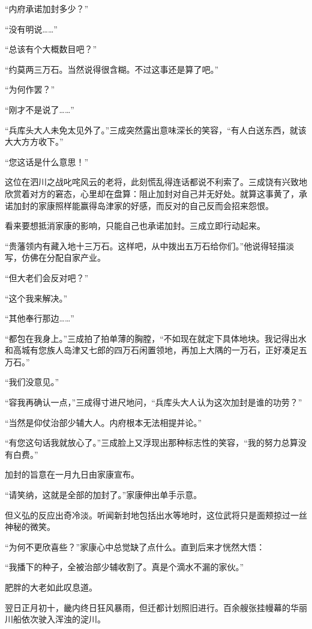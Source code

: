 \documentclass[
]{book}
\begin{document}
``内府承诺加封多少？''

``没有明说\ldots\ldots{}''

``总该有个大概数目吧？''

``约莫两三万石。当然说得很含糊。不过这事还是算了吧。''

``为何作罢？''

``刚才不是说了\ldots\ldots{}''

``兵库头大人未免太见外了。''三成突然露出意味深长的笑容，``有人白送东西，就该大大方方收下。''

``您这话是什么意思！''

这位在泗川之战叱咤风云的老将，此刻慌乱得连话都说不利索了。三成饶有兴致地欣赏着对方的窘态，心里却在盘算：阻止加封对自己并无好处。就算这事黄了，承诺加封的家康照样能赢得岛津家的好感，而反对的自己反而会招来怨恨。

看来要想抵消家康的影响，只能自己也承诺加封。三成立即行动起来。

``贵藩领内有藏入地十三万石。这样吧，从中拨出五万石给你们。''他说得轻描淡写，仿佛在分配自家产业。

``但大老们会反对吧？''

``这个我来解决。''

``其他奉行那边\ldots\ldots{}''

``都包在我身上。''三成拍了拍单薄的胸膛，``不如现在就定下具体地块。我记得出水和高城有您族人岛津又七郎的四万石闲置领地，再加上大隅的一万石，正好凑足五万石。''

``我们没意见。''

``容我再确认一点，''三成得寸进尺地问，``兵库头大人认为这次加封是谁的功劳？''

``当然是仰仗治部少辅大人。内府根本无法相提并论。''

``有您这句话我就放心了。''三成脸上又浮现出那种标志性的笑容，``我的努力总算没有白费。''

加封的旨意在一月九日由家康宣布。

``请笑纳，这就是全部的加封了。''家康伸出单手示意。

但义弘的反应出奇冷淡。听闻新封地包括出水等地时，这位武将只是面颊掠过一丝神秘的微笑。

``为何不更欣喜些？''家康心中总觉缺了点什么。直到后来才恍然大悟：

``我播下的种子，全被治部少辅收割了。真是个滴水不漏的家伙。''

肥胖的大老如此叹息道。

翌日正月初十，畿内终日狂风暴雨，但迁都计划照旧进行。百余艘张挂幔幕的华丽川船依次驶入浑浊的淀川。
\end{document}
